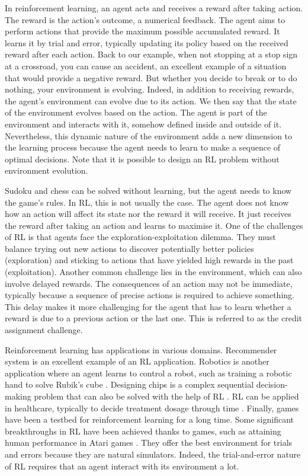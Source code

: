 In reinforcement learning, an agent acts and receives a reward after taking action.
The reward is the action's outcome, a numerical feedback.
The agent aims to perform actions that provide the maximum possible accumulated reward.
It learns it by trial and error, typically updating its policy based on the received reward after each action.
Back to our example, when not stopping at a stop sign at a crossroad, you can cause an accident, an excellent example of a situation that would provide a negative reward.
But whether you decide to break or to do nothing, your environment is evolving.
Indeed, in addition to receiving rewards, the agent's environment can evolve due to its action.
We then say that the state of the environment evolves based on the action.
The agent is part of the environment and interacts with it, somehow defined inside and outside of it.
Nevertheless, this dynamic nature of the environment adds a new dimension to the learning process because the agent needs to learn to make a sequence of optimal decisions.
Note that it is possible to design an RL problem without environment evolution.

Sudoku and chess can be solved without learning, but the agent needs to know the game's rules.
In RL, this is not usually the case.
The agent does not know how an action will affect its state nor the reward it will receive.
It just receives the reward after taking an action and learns to maximise it.
One of the challenges of RL is that agents face the exploration-exploitation dilemma.
They must balance trying out new actions to discover potentially better policies (exploration) and sticking to actions that have yielded high rewards in the past (exploitation).
Another common challenge lies in the environment, which can also involve delayed rewards. 
The consequences of an action may not be immediate, typically because a sequence of precise actions is required to achieve something.
This delay makes it more challenging for the agent that has to learn whether a reward is due to a previous action or the last one.
This is referred to as the credit assignment challenge.

Reinforcement learning has applications in various domains.
Recommender system \citep{mcinerney2018explore} is an excellent example of an RL application.
Robotics is another application where an agent learns to control a robot, such as training a robotic hand to solve Rubik's cube \citep{akkaya2019solving}.
Designing chips is a complex sequential decision-making problem that can also be solved with the help of RL \citep{mirhoseini2021graph}. 
RL can be applied in healthcare, typically to decide treatment dosage through time \citep{miotto2018deep}.
Finally, games have been a testbed for reinforcement learning for a long time.
Some significant breakthroughs in RL have been achieved thanks to games, such as attaining human performance in Atari games \citep{Mnih2015}.
They offer the best environment for trials and errors because they are natural simulators.
Indeed, the trial-and-error nature of RL requires that an agent interact with its environment a lot.

